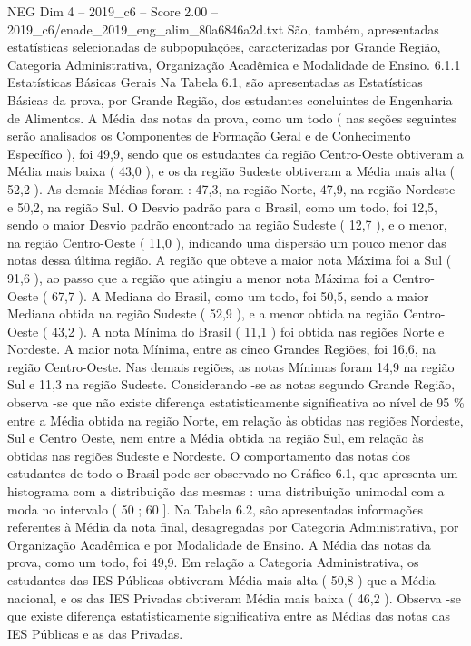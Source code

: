 \begin{textsample}{NEG Dim 4 – 2019\_c6 – Score 2.00 – 2019\_c6/enade\_2019\_eng\_alim\_80a6846a2d.txt}
São, também, apresentadas estatísticas selecionadas de subpopulações, caracterizadas por Grande Região, Categoria Administrativa, Organização Acadêmica e Modalidade de Ensino. 6.1.1 Estatísticas Básicas Gerais Na Tabela 6.1, são apresentadas as Estatísticas Básicas da prova, por Grande Região, dos estudantes concluintes de Engenharia de Alimentos.
A Média das notas da prova, como um todo ( nas seções seguintes serão analisados os Componentes de Formação Geral e de Conhecimento Específico ), foi 49,9, sendo que os estudantes da região Centro-Oeste obtiveram a Média mais baixa ( 43,0 ), e os da região Sudeste obtiveram a Média mais alta ( 52,2 ).
As demais Médias foram : 47,3, na região Norte, 47,9, na região Nordeste e 50,2, na região Sul.
O Desvio padrão para o Brasil, como um todo, foi 12,5, sendo o maior Desvio padrão encontrado na região Sudeste ( 12,7 ), e o menor, na região Centro-Oeste ( 11,0 ), indicando uma dispersão um pouco menor das notas dessa última região.
A região que obteve a maior nota Máxima foi a Sul ( 91,6 ), ao passo que a região que atingiu a menor nota Máxima foi a Centro-Oeste ( 67,7 ).
A Mediana do Brasil, como um todo, foi 50,5, sendo a maior Mediana obtida na região Sudeste ( 52,9 ), e a menor obtida na região Centro-Oeste ( 43,2 ).
A nota Mínima do Brasil ( 11,1 ) foi obtida nas regiões Norte e Nordeste.
A maior nota Mínima, entre as cinco Grandes Regiões, foi 16,6, na região Centro-Oeste.
Nas demais regiões, as notas Mínimas foram 14,9 na região Sul e 11,3 na região Sudeste.
Considerando -se as notas segundo Grande Região, observa -se que não existe diferença estatisticamente significativa ao nível de 95 \% entre a Média obtida na região Norte, em relação às obtidas nas regiões Nordeste, Sul e Centro Oeste, nem entre a Média obtida na região Sul, em relação às obtidas nas regiões Sudeste e Nordeste.
O comportamento das notas dos estudantes de todo o Brasil pode ser observado no Gráfico 6.1, que apresenta um histograma com a distribuição das mesmas : uma distribuição unimodal com a moda no intervalo ( 50 ; 60 ].
Na Tabela 6.2, são apresentadas informações referentes à Média da nota final, desagregadas por Categoria Administrativa, por Organização Acadêmica e por Modalidade de Ensino.
A Média das notas da prova, como um todo, foi 49,9.
Em relação a Categoria Administrativa, os estudantes das IES Públicas obtiveram Média mais alta ( 50,8 ) que a Média nacional, e os das IES Privadas obtiveram Média mais baixa ( 46,2 ).
Observa -se que existe diferença estatisticamente significativa entre as Médias das notas das IES Públicas e as das Privadas.

\end{textsample}
